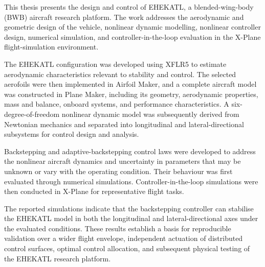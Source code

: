 


\begin{abstracts}        %

This thesis presents the design and control of EHEKATL, a blended-wing-body (BWB) aircraft research platform. The work addresses the aerodynamic and geometric design of the vehicle, nonlinear dynamic modelling, nonlinear controller design, numerical simulation, and controller-in-the-loop evaluation in the X-Plane flight-simulation environment.

The EHEKATL configuration was developed using XFLR5 to estimate aerodynamic characteristics relevant to stability and control. The selected aerofoils were then implemented in Airfoil Maker, and a complete aircraft model was constructed in Plane Maker, including its geometry, aerodynamic properties, mass and balance, onboard systems, and performance characteristics. A six-degree-of-freedom nonlinear dynamic model was subsequently derived from Newtonian mechanics and separated into longitudinal and lateral-directional subsystems for control design and analysis.

Backstepping and adaptive-backstepping control laws were developed to address the nonlinear aircraft dynamics and uncertainty in parameters that may be unknown or vary with the operating condition. Their behaviour was first evaluated through numerical simulations. Controller-in-the-loop simulations were then conducted in X-Plane for representative flight tasks.

The reported simulations indicate that the backstepping controller can stabilise the EHEKATL model in both the longitudinal and lateral-directional axes under the evaluated conditions. These results establish a basis for reproducible validation over a wider flight envelope, independent actuation of distributed control surfaces, optimal control allocation, and subsequent physical testing of the EHEKATL research platform.

\end{abstracts}
